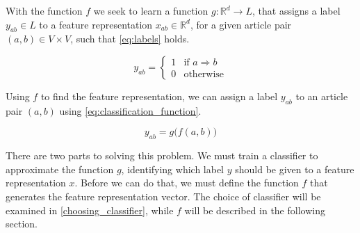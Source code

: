 With the function $f$ we seek to learn a function $g: \mathbb{R}^d \to L$, that assigns a label $y_{ab} \in L$ to a feature representation $x_{ab} \in \mathbb{R}^d$, for a given article pair $(a,b) \in V \times V$, such that \cref{eq:labels} holds.


\begin{equation}
\label{eq:labels}
    y_{ab}=
    \begin{cases}
        1 & \text{if } a \Rightarrow b\\
        0 & \text{otherwise}
    \end{cases}
\end{equation}

Using $f$ to find the feature representation, we can assign a label $y_{ab}$ to an article pair $(a,b)$ using \cref{eq:classification_function}.

\begin{equation}
\label{eq:classification_function}
  y_{ab} = g\big(f(a,b)\big)
\end{equation}

There are two parts to solving this problem. We must train a classifier to approximate the function $g$, identifying which label $y$ should be given to a feature representation $x$. Before we can do that, we must define the function $f$ that generates the feature representation vector. The choice of classifier will be examined in \cref{choosing_classifier}, while $f$ will be described in the following section.




%
%
%

